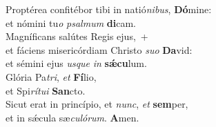 \oddverse Proptérea confitébor tibi in natió\textit{ni}\textit{bus}, \textbf{Dó}mine:~\*\\
\oddverse et nómini tu\textit{o} \textit{psal}\textit{mum} \textbf{di}cam.\\
\evenverse Magníficans salútes Regis ejus,~+\\
\evenverse  et fáciens misericórdiam Christo \textit{su}\textit{o} \textbf{Da}vid:~\*\\
\evenverse et sémini ejus \textit{us}\textit{que} \textit{in} \textbf{sǽ}\textbf{cu}lum.\\
\oddverse Glória Pa\textit{tri}, \textit{et} \textbf{Fí}lio,~\*\\
\oddverse et Spi\textit{rí}\textit{tu}\textit{i} \textbf{San}cto.\\
\evenverse Sicut erat in princípio, et \textit{nunc}, \textit{et} \textbf{sem}per,~\*\\
\evenverse et in sǽcula sæ\textit{cu}\textit{ló}\textit{rum}. \textbf{A}men.\\
